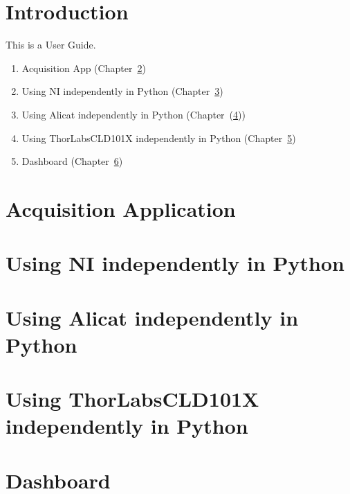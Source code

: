 \documentclass[12pt,oneside]{book}
\begin{document}

\hypersetup{pageanchor=false}

\begin{minipage}[t][9in][s]{6.25in}
\titleA
\titleB
\vfill
\titleD
\titleE
\end{minipage}

{
\hypersetup{linkcolor=black} 
\tableofcontents
}

\mainmatter


\chapter{Introduction}

This is a User Guide.

\begin{enumerate}
	\item Acquisition App (Chapter~\ref{chap:Acquisition})
	\item Using NI independently in Python (Chapter~\ref{chap:NIAPI})
	\item Using Alicat independently in Python (Chapter~(\ref{chap:AlicatAPI}))
	\item Using ThorLabsCLD101X independently in Python (Chapter~\ref{chap:ThorLabsAPI})
	\item Dashboard (Chapter~\ref{chap:dashboard})
\end{enumerate}{}


\chapter{Acquisition Application}\label{chap:Acquisition}
\lipsum[2]

\chapter{Using NI independently in Python}\label{chap:NIAPI}
\lipsum[1]

\chapter{Using Alicat independently in Python}\label{chap:AlicatAPI}
\lipsum[1]


\chapter{Using ThorLabsCLD101X independently in Python}\label{chap:ThorLabsAPI}
\lipsum[1]

\chapter{Dashboard}\label{chap:dashboard}
\lipsum[0]
\end{document}
